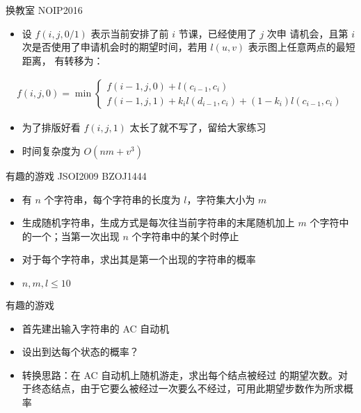 \documentclass{beamer}
\begin{document}
    \begin{frame}{换教室}
        {NOIP2016}
        \begin{itemize}
            \setlength{\itemsep}{10pt}
            \item 设 $f(i,j,0/1)$ 表示当前安排了前 $i$ 节课，已经使用了 $j$ 次申
            请机会，且第 $i$ 次是否使用了申请机会时的期望时间，若用 $l(u,v)$ 表示图上任意两点的最短距离，
            有转移为：
        \end{itemize}
        \begin{gather*}
            f(i,j,0) = \min\begin{cases}
                f(i-1,j,0)+l(c_{i-1},c_i) \\
                f(i-1,j,1)+k_il(d_{i-1},c_i) + (1-k_i)l(c_{i-1},c_i)
            \end{cases}
        \end{gather*}
        \begin{itemize}
            \setlength{\itemsep}{10pt}
            \item 为了排版好看 $f(i,j,1)$ 太长了就不写了，留给大家练习
            \item 时间复杂度为 $O(nm+v^3)$
        \end{itemize}
    \end{frame}

    \begin{frame}{有趣的游戏}
        {JSOI2009 BZOJ1444}
        \begin{itemize}
            \setlength{\itemsep}{10pt}
            \item 有 $n$ 个字符串，每个字符串的长度为 $l$，字符集大小为 $m$
            \item 生成随机字符串，生成方式是每次往当前字符串的末尾随机加上 $m$ 个字符中的一个；当第一次出现 $n$ 个字符串中的某个时停止
            \item 对于每个字符串，求出其是第一个出现的字符串的概率
            \item $n,m,l \le 10$
        \end{itemize}
    \end{frame}

    \begin{frame}{有趣的游戏}
        \begin{itemize}
            \setlength{\itemsep}{10pt}
            \item 首先建出输入字符串的 AC 自动机
            \item 设出到达每个状态的概率？
            \item 转换思路：在 AC 自动机上随机游走，求出每个结点被经过
            的期望次数。对于终态结点，由于它要么被经过一次要么不经过，可用此期望步数作为所求概率
        \end{itemize}
    \end{frame}
\end{document}
